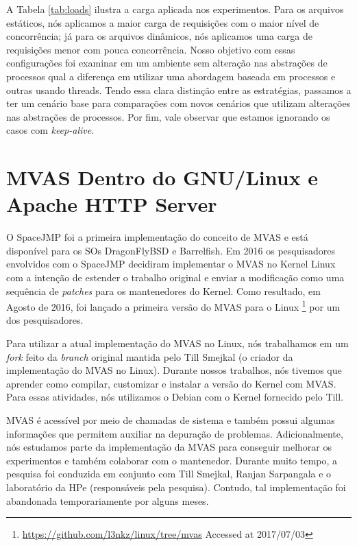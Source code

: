 

A Tabela \ref{tab:loads} ilustra a carga aplicada nos experimentos. Para os
arquivos estáticos, nós aplicamos a maior carga de requisições com o maior
nível de concorrência; já para os arquivos dinâmicos, nós aplicamos uma carga
de requisições menor com pouca concorrência. Nosso objetivo com essas
configurações foi examinar em um ambiente sem alteração nas abstrações de
processos qual a diferença em utilizar uma abordagem baseada em processos e
outras usando threads. Tendo essa clara distinção entre as estratégias,
passamos a ter um cenário base para comparações com novos cenários que utilizam
alterações nas abstrações de processos. Por fim, vale observar que estamos
ignorando os casos com \emph{keep-alive}.

\section{MVAS Dentro do GNU/Linux e Apache HTTP Server}
\label{sec:mvas_inside_httpd}

O SpaceJMP \citep{spacejmp} foi a primeira implementação do conceito de MVAS e
está disponível para os SOs DragonFlyBSD e Barrelfish. Em 2016 os pesquisadores
envolvidos com o SpaceJMP decidiram implementar o MVAS no Kernel Linux com a
intenção de estender o trabalho original e enviar a modificação como uma
sequência de \emph{patches} para os mantenedores do Kernel. Como resultado, em
Agosto de 2016, foi lançado a primeira versão do MVAS para o Linux
\footnote{\url{https://github.com/l3nkz/linux/tree/mvas} Accessed at 2017/07/03} por
um dos pesquisadores.
 
Para utilizar a atual implementação do MVAS no Linux, nós trabalhamos em um
\emph{fork} feito da \emph{branch} original mantida pelo Till Smejkal (o
criador da implementação do MVAS no Linux). Durante nossos trabalhos, nós
tivemos que aprender como compilar, customizar e instalar a versão do Kernel
com MVAS. Para essas atividades, nós utilizamos o Debian com o Kernel fornecido
pelo Till.

MVAS é acessível por meio de chamadas de sistema e também possui algumas
informações que permitem auxiliar na depuração de problemas. Adicionalmente,
nós estudamos parte da implementação da MVAS para conseguir melhorar os
experimentos e também colaborar com o mantenedor. Durante muito tempo, a
pesquisa foi conduzida em conjunto com Till Smejkal, Ranjan Sarpangala e o
laboratório da HPe (responsáveis pela pesquisa). Contudo, tal implementação foi
abandonada temporariamente por alguns meses.
 
